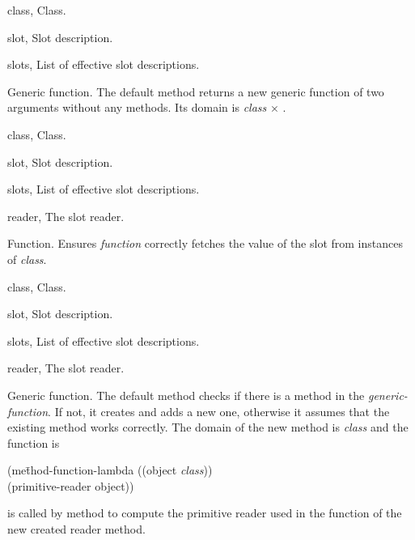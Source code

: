 \begin{optDefinition}
%
\begin{specargs}
    \item[class, \classref{class}] Class.
    \item[slot, \classref{slot}] Slot description.
    \item[slots, \classref{list}] List of effective slot
    descriptions.
\end{specargs}
%
\result%
Generic function.
%
\remarks%
The default method returns a new generic function of two arguments
without any methods. Its domain is {\em class} $\times$ .

%
\begin{genericargs}
    \item[class, \classref{class}] Class.
    \item[slot, \classref{slot}] Slot description.
    \item[slots, \classref{list}] List of effective slot
    descriptions.
    \item[reader, \classref{function}] The slot reader.
\end{genericargs}
%
\result%
Function.
%
\remarks%
Ensures {\em function} correctly fetches the value of the slot from
instances of {\em class}.

%
\begin{specargs}
    \item[class, \classref{class}] Class.
    \item[slot, \classref{slot}] Slot description.
    \item[slots, \classref{list}] List of effective slot descriptions.
    \item[reader, \classref{generic-function}] The slot reader.
\end{specargs}
%
\result%
Generic function.
%
\remarks%
The default method checks if there is a method in the {\em
generic-function}. If not, it creates and adds a new one, otherwise it
assumes that the existing method works correctly. The domain
of the new method is {\em class} and the function is
{\tt\begin{tabbing}
(me\=thod-function-lambda ((object {\em class}))\\
   \>(primitive-reader object))
\end{tabbing}}
 is called by
 method to compute the primitive reader used
in the function of the new created reader method.


\end{optDefinition}
